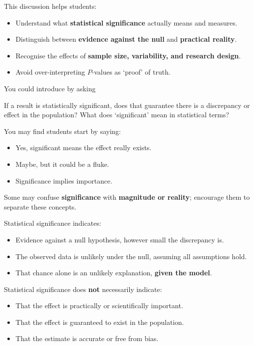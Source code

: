 \documentclass[
  11pt,
  a4paper,
  krantz2]{krantz}
\makeatletter
\providecommand{\tightlist}{%
  \setlength{\itemsep}{0pt}\setlength{\parskip}{0pt}}
\renewenvironment{quote}%
{\begin{kframe}}
{\end{kframe}}
\newenvironment{kframe}{%
\medskip{}
\setlength{\fboxsep}{.8em}
 \def\at@end@of@kframe{}%
 \ifinner\ifhmode%
  \def\at@end@of@kframe{\end{minipage}}%
  \begin{minipage}{\columnwidth}%
 \fi\fi%
 \def\FrameCommand##1{\hskip\@totalleftmargin \hskip-\fboxsep
 \colorbox{shadecolor}{##1}\hskip-\fboxsep
     \hskip-\linewidth \hskip-\@totalleftmargin \hskip\columnwidth}%
 \MakeFramed {\advance\hsize-\width
   \@totalleftmargin\z@ \linewidth\hsize
   \@setminipage}}%
 {\par\unskip\endMakeFramed%
 \at@end@of@kframe}
\renewenvironment{quote}
               {\list{}{\vspace{-0.5em}\begin{kframe}\small%
                        \rightmargin   \leftmargin
                        \parsep        \z@ \@plus\p@}%
                \item\relax}
               {\end{kframe}\endlist}
\makeatother
\begin{document}
This discussion helps students:

\begin{itemize}
\tightlist
\item
  Understand what \textbf{statistical significance} actually means and measures.
\item
  Distinguish between \textbf{evidence against the null} and \textbf{practical reality}.
\item
  Recognise the effects of \textbf{sample size, variability, and research design}.
\item
  Avoid over-interpreting \(P\)-values as `proof' of truth.
\end{itemize}

You could introduce by asking

\begin{quote}
If a result is statistically significant, does that guarantee there is a discrepancy or effect in the population?
What does `significant' mean in statistical terms?
\end{quote}

You may find students start by saying:

\begin{itemize}
\tightlist
\item
  Yes, significant means the effect really exists.
\item
  Maybe, but it could be a fluke.
\item
  Significance implies importance.
\end{itemize}

Some may confuse \textbf{significance} with \textbf{magnitude or reality}; encourage them to separate these concepts.

Statistical significance indicates:

\begin{itemize}
\tightlist
\item
  Evidence against a null hypothesis, however small the discrepancy is.
\item
  The observed data is unlikely under the null, assuming all assumptions hold.
\item
  That chance alone is an unlikely explanation, \textbf{given the model}.
\end{itemize}

Statistical significance does \textbf{not} necessarily indicate:

\begin{itemize}
\tightlist
\item
  That the effect is practically or scientifically important.
\item
  That the effect is guaranteed to exist in the population.
\item
  That the estimate is accurate or free from bias.
\end{itemize}
\end{document}
